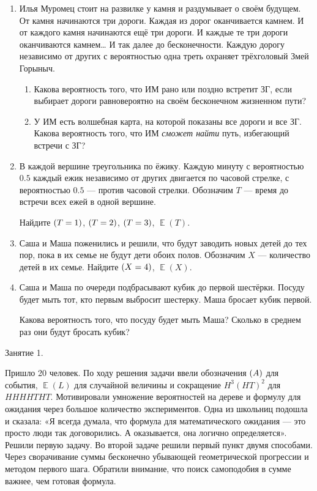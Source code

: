 \documentclass[12pt]{article}
\DeclareMathOperator{\E}{\mathbb{E}}
\newcommand{\addtag}[1]{}
\let\P\relax
\DeclareMathOperator{\P}{\mathbb{P}}
\theoremstyle{definition}
\begin{document}
{\begin{enumerate}
\item Илья Муромец стоит на развилке у камня и раздумывает о своём будущем. 
От камня начинаются три дороги. 
Каждая из дорог оканчивается камнем.
И от каждого камня начинаются ещё три дороги. 
И каждые те три дороги оканчиваются камнем\ldots{ } 
И так далее до бесконечности. 
Каждую дорогу независимо от других с вероятностью одна треть охраняет трёхголовый Змей Горыныч. 

\begin{enumerate}
  \item Какова вероятность того, что ИМ рано или поздно встретит ЗГ, если выбирает дороги равновероятно на своём бесконечном жизненном пути?
  \item У ИМ есть волшебная карта, на которой показаны все дороги и все ЗГ. 
  Какова вероятность того, что ИМ \textit{сможет найти} путь, избегающий встречи с ЗГ?
\end{enumerate}

\item В каждой вершине треугольника по ёжику. Каждую минуту с вероятностью $0.5$ каждый ежик
независимо от других двигается по часовой стрелке, с вероятностью
$0.5$ — против часовой стрелки.
Обозначим $T$ — время до встречи всех ежей в одной вершине.

Найдите $\P(T=1)$, $\P(T=2)$, $\P(T=3)$, $\E(T)$.

\item Саша и Маша поженились и решили, что будут заводить новых детей до тех пор,
пока в их семье не будут дети обоих полов. Обозначим $X$ — количество детей в их семье.
Найдите $\P(X=4)$, $\E(X)$.

\item Саша и Маша по очереди подбрасывают кубик\addtag{кубик} до первой шестёрки.
Посуду будет мыть тот, кто первым выбросит шестерку.
Маша бросает кубик первой.

Какова вероятность того, что посуду будет мыть Маша?
Сколько в среднем раз они будут бросать кубик\addtag{кубик}?
\end{enumerate}
}

Занятие 1. 

Пришло 20 человек. 
По ходу решения задачи ввели обозначения $\P(A)$ для события,
$\E(L)$ для случайной величины и сокращение $H^3(HT)^2$ для $HHHHTHT$.
Мотивировали умножение вероятностей на дереве и формулу для ожидания через большое количество экспериментов. 
Одна из школьниц подошла и сказала: 
«Я всегда думала, что формула для математического ожидания — это просто люди так договорились.
А оказывается, она логично определяется».
Решили первую задачу. Во второй задаче решили первый пункт двумя способами. 
Через сворачивание суммы бесконечно убывающей геометрической прогрессии и методом первого шага. 
Обратили внимание, что поиск самоподобия в сумме важнее, чем готовая формула. 
\end{document}
